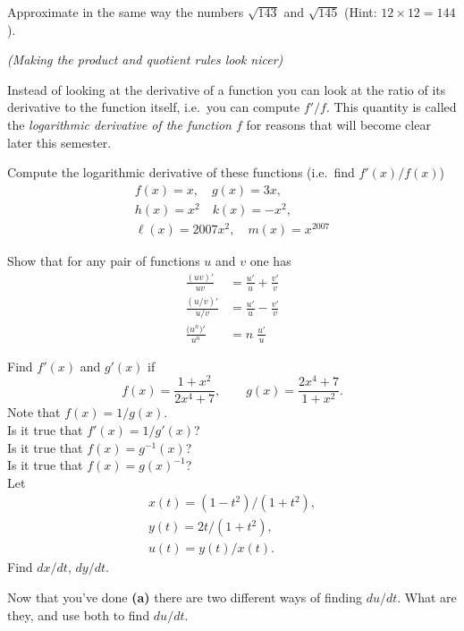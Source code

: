 \begin{multicols}{2}
\subprob Approximate in the same way the numbers $\sqrt{143}$ and
$\sqrt{145}$ (Hint: $12\times12=144$).


\problem\label{ex:05log-derivs}
\textit{(Making the product and quotient rules look nicer)}

Instead of looking at the derivative of a function you
can look at the ratio of its derivative to the function itself, i.e.\
you can compute $f'/f$.  This quantity is called the
\emph{logarithmic derivative of the function $f$} for reasons that
will become clear later this semester.

\subprob Compute the logarithmic derivative of these functions (i.e.\ find
$f'(x)/f(x)$)
\begin{gather*}
  f(x) = x ,\quad g(x) =3x ,\\
  h(x) =x^2 \quad k(x) =-x^2 ,\\
  \ell(x) =2007x^2,\quad m(x) =x^{2007}
\end{gather*}

\subprob Show that for any pair of functions $u$ and $v$ one has
\begin{align*}
  \frac{(uv)'}{uv} &= \frac{u'}{u} + \frac{v'}{v}\\
  \frac{(u/v)'}{u/v} &= \frac{u'}{u} - \frac{v'}{v}\\
  \frac{\bigl(u^n\bigr)'}{u^n} &= n\; \frac{u'}{u}
\end{align*}




\problem  
\subprob Find $f'(x)$ and $g'(x)$ if
\[
f(x)=\frac{1+x^2}{2x^4+7}, \qquad g(x)=\frac{2x^4+7}{1+x^2}.
\]
Note that $f(x)=1/g(x)$.\\
\subprob Is it true that $f'(x)=1/g'(x)$?\\
\subprob Is it true that $f(x) = g^{-1}(x)$?\\
\subprob Is it true that $f(x)= g(x)^{-1}$?\\


\problem \subprob Let
\begin{gather*}
  x(t)=(1-t^2)/(1+t^2),\\
  y(t)=2t/(1+t^2),\\
  u(t)=y(t)/x(t).
\end{gather*}
Find $dx/dt$, $dy/dt$.

\subprob Now that you've done \textbf{(a)} there are two
different ways of finding $du/dt$.  What are they, and use
both to find $du/dt$.

\end{multicols}
\normalsize\rmfamily


